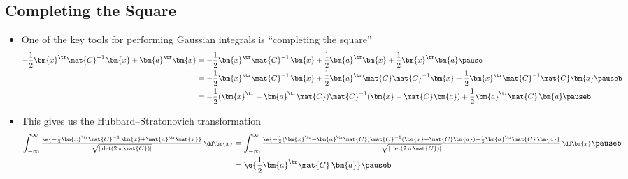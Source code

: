 
\begin{slide}
\section[-1]{Completing the Square}

\begin{PauseHighLight}
  \begin{itemize}
  \item One of the key tools for performing Gaussian integrals
    is ``completing the square''
    \begin{align*}
      -\frac{1}{2 }\bm{x}^\tr \mat{C}^{-1}\,\bm{x} + \bm{a}^\tr \bm{x}
      &= -\frac{1}{2} \bm{x}^\tr \mat{C}^{-1}\,\bm{x} + \frac{1}{2}
        \bm{a}^\tr \bm{x} + \frac{1}{2} \bm{x}^\tr \bm{a} \pause \\ 
      &= -\frac{1}{2} \bm{x}^\tr \mat{C}^{-1}\,\bm{x} + \frac{1}{2} \bm{a}^\tr
        \mat{C} \mat{C}^{-1} \bm{x} +\frac{1}{2} \bm{x}^\tr
        \mat{C}^{-1} \mat{C} \bm{a} \pauseb \\
      &= -\frac{1}{2} (\bm{x}^\tr - \bm{a}^\tr\mat{C}) \mat{C}^{-1}
        (\bm{x}-\mat{C} \bm{a}) + \frac{1}{2} \bm{a}^\tr \mat{C}\,\bm{a}\pauseb
    \end{align*}
  \item This gives us the Hubbard–Stratonovich transformation
    \begin{align*}
      \int_{-\infty}^{\infty} 
      \tfrac{\e{-\frac{1}{2 }\bm{x}^\tr \mat{C}^{-1}\,\bm{x} + \mat{a}^\tr
      \mat{x}}}{\sqrt{|\det(2\,\pi\,\mat{C})|}} \, {\scriptstyle \dd \bm{x}}
      &= \int_{-\infty}^{\infty}
      \tfrac{\e{-\frac{1}{2} (\bm{x}^\tr - \bm{a}^\tr\mat{C}) \mat{C}^{-1}
        (\bm{x}-\mat{C} \bm{a}) + \frac{1}{2} \bm{a}^\tr
        \mat{C}\,\bm{a}}}{\sqrt{|\det(2\,\pi\,\mat{C})|}} \, {\scriptstyle \dd \bm{x}}\pauseb \\
      &= \e{\frac{1}{2} \bm{a}^\tr
        \mat{C}\,\bm{a}} \pauseb
    \end{align*}
  \end{itemize}
\end{PauseHighLight}

\end{slide}




